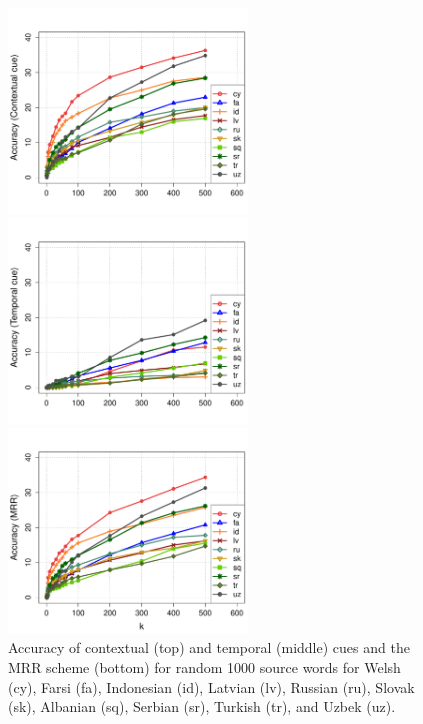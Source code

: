\documentclass{article}
\begin{document}
\begin{figure}[h!]
\centerline{\mbox{\includegraphics[width=2.5in]{figures/exp3/rand/randcontext}}}
\centerline{\mbox{\includegraphics[width=2.5in]{figures/exp3/rand/randtime}}}
\centerline{\mbox{\includegraphics[width=2.5in]{figures/exp3/rand/randmrr}}}
\caption{Accuracy of contextual (top) and temporal (middle) cues and the MRR scheme (bottom) for random 1000 source words for Welsh (cy), Farsi (fa), Indonesian (id), Latvian (lv), Russian (ru), Slovak (sk), Albanian (sq), Serbian (sr), Turkish (tr), and Uzbek (uz).}
\label{fig:exp3}
\end{figure}

\end{document}
